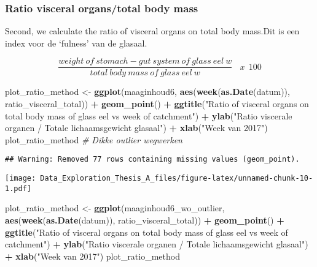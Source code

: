 \documentclass[]{article}
\newenvironment{Shaded}{\begin{snugshade}}{\end{snugshade}}
\newcommand{\KeywordTok}[1]{\textcolor[rgb]{0.13,0.29,0.53}{\textbf{#1}}}
\newcommand{\StringTok}[1]{\textcolor[rgb]{0.31,0.60,0.02}{#1}}
\newcommand{\CommentTok}[1]{\textcolor[rgb]{0.56,0.35,0.01}{\textit{#1}}}
\newcommand{\OperatorTok}[1]{\textcolor[rgb]{0.81,0.36,0.00}{\textbf{#1}}}
\newcommand{\NormalTok}[1]{#1}
\begin{document}
\subsubsection{Ratio visceral organs/total body
mass}\label{ratio-visceral-organstotal-body-mass}

Second, we calculate the ratio of visceral organs on total body mass.Dit
is een index voor de `fulness' van de glasaal.

\[ \frac{weight~of~stomach-gut~system~of~glass~eel~w}{total~body~mass~of~glass~eel~w}~~~~ x ~~ 100  \]

\begin{Shaded}
\begin{Highlighting}[]
\NormalTok{plot_ratio_method <-}\StringTok{ }\KeywordTok{ggplot}\NormalTok{(maaginhoud6, }\KeywordTok{aes}\NormalTok{(}\KeywordTok{week}\NormalTok{(}\KeywordTok{as.Date}\NormalTok{(datum)), ratio_visceral_total)) }\OperatorTok{+}
\StringTok{  }\KeywordTok{geom_point}\NormalTok{() }\OperatorTok{+}
\StringTok{  }\KeywordTok{ggtitle}\NormalTok{(}\StringTok{"Ratio of visceral organs on total body mass of glass eel vs week of catchment"}\NormalTok{) }\OperatorTok{+}
\StringTok{  }\KeywordTok{ylab}\NormalTok{(}\StringTok{"Ratio viscerale organen / Totale lichaamsgewicht glasaal"}\NormalTok{) }\OperatorTok{+}
\StringTok{  }\KeywordTok{xlab}\NormalTok{(}\StringTok{"Week van 2017"}\NormalTok{)}
\NormalTok{plot_ratio_method  }\CommentTok{# Dikke outlier wegwerken}
\end{Highlighting}
\end{Shaded}

\begin{verbatim}
## Warning: Removed 77 rows containing missing values (geom_point).
\end{verbatim}

\texttt{[image: Data\_Exploration\_Thesis\_A\_files/figure-latex/unnamed-chunk-10-1.pdf]}

\begin{Shaded}
\begin{Highlighting}[]
\NormalTok{plot_ratio_method <-}\StringTok{ }\KeywordTok{ggplot}\NormalTok{(maaginhoud6_wo_outlier, }\KeywordTok{aes}\NormalTok{(}\KeywordTok{week}\NormalTok{(}\KeywordTok{as.Date}\NormalTok{(datum)), ratio_visceral_total)) }\OperatorTok{+}
\StringTok{  }\KeywordTok{geom_point}\NormalTok{() }\OperatorTok{+}
\StringTok{  }\KeywordTok{ggtitle}\NormalTok{(}\StringTok{"Ratio of visceral organs on total body mass of glass eel vs week of catchment"}\NormalTok{) }\OperatorTok{+}
\StringTok{  }\KeywordTok{ylab}\NormalTok{(}\StringTok{"Ratio viscerale organen / Totale lichaamsgewicht glasaal"}\NormalTok{) }\OperatorTok{+}
\StringTok{  }\KeywordTok{xlab}\NormalTok{(}\StringTok{"Week van 2017"}\NormalTok{)}
\NormalTok{plot_ratio_method }
\end{Highlighting}
\end{Shaded}
\end{document}

